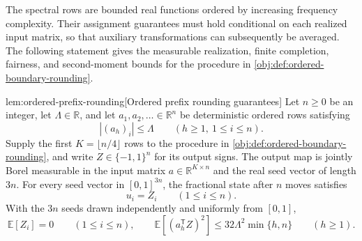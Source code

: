 \documentclass[11pt]{article}
\begin{document}
The spectral rows are bounded real functions ordered by increasing frequency complexity. Their assignment guarantees must hold conditional on each realized input matrix, so that auxiliary transformations can subsequently be averaged. The following statement gives the measurable realization, finite completion, fairness, and second-moment bounds for the procedure in \cref{obj:def:ordered-boundary-rounding}.

\begin{lemmav}{lem:ordered-prefix-rounding}[Ordered prefix rounding guarantees]
Let \(n\geq0\) be an integer, let \(\Lambda\in\mathbb R\), and let \(a_1,a_2,\ldots\in\mathbb R^n\) be deterministic ordered rows satisfying
\[
|(a_h)_i|\leq\Lambda
\qquad(h\geq1,\ 1\leq i\leq n).
\]
Supply the first \(K=\lfloor n/4\rfloor\) rows to the procedure in \cref{obj:def:ordered-boundary-rounding}, and write \(Z\in\{-1,1\}^n\) for its output signs. The output map is jointly Borel measurable in the input matrix \(a\in\mathbb R^{K\times n}\) and the real seed vector of length \(3n\). For every seed vector in \([0,1]^{3n}\), the fractional state after \(n\) moves satisfies
\[
u_i=Z_i\qquad(1\leq i\leq n).
\]
With the \(3n\) seeds drawn independently and uniformly from \([0,1]\),
\[
\mathbb E[Z_i]=0
\qquad(1\leq i\leq n),
\qquad
\mathbb E\!\left[(a_h^{\mathsf T}Z)^2\right]
\leq32\Lambda^2\min\{h,n\}
\qquad(h\geq1).
\]
\end{lemmav}
\end{document}

